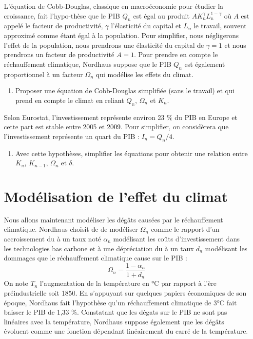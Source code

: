 \documentclass[12pt,a4paper]{article}
\newcommand{\ques}[1]{\begin{enumerate}[resume]
\item  #1
\end{enumerate}}
\newcommand{\rep}[1]{\textit{Réponse :} #1 \\}
\renewcommand{\rep}[1]{ }
\theoremstyle{remark}
\begin{document}
{L'équation de Cobb-Douglas, classique en macroéconomie pour étudier la croissance, fait l'hypo-thèse que le PIB $Q_n$ est égal au produit $AK_n^\gamma L_n^{1-\gamma}$ où $A$ est appelé le facteur de productivité, $\gamma$ l'élasticité du capital et $L_n$ le travail, souvent approximé comme étant égal à la population.
Pour simplifier, nous négligerons l'effet de la population, nous prendrons une élasticité du capital de $\gamma=1$ et nous prendrons un facteur de productivité $A=1$.
Pour prendre en compte le réchauffement climatique, Nordhaus suppose que le PIB $Q_n$ est également proportionnel à un facteur $\Omega_n$ qui modélise les effets du climat. 
\ques{  Proposer une équation de Cobb-Douglas simplifiée (sans le travail) et qui prend en compte le climat en reliant $Q_{n}$, $\Omega_n$ et $K_{n}$.
}
\rep{ $Q_{n}=A \Omega_n K_n$ }
Selon Eurostat, l'investissement représente environ 23 \% du PIB en Europe et cette part est stable entre 2005 et 2009. Pour simplifier, on considèrera que l'investissement représente un quart du PIB : $I_n=Q_n/4$.
\ques{Avec cette hypothèses, simplifier les équations pour obtenir une relation entre $K_n$, $K_{n-1}$, $\Omega_n$ et $\delta$. \label{ques:dynamique_K_1}}
\rep{\begin{equation*} K_n=\frac{1- \delta}{1- \frac{A\Omega_n}{4}} K_{n-1}\end{equation*}}


\section*{\sc Modélisation de l'effet du climat}

Nous allons maintenant modéliser les dégâts causées par le réchauffement climatique. Nordhaus choisit de de modéliser $\Omega_n$ comme le rapport d'un accroissement du à un taux noté $\alpha_n$ modélisant les coûts d'investissement dans les technologies bas carbone et à une dépréciation du à un taux $d_n$ modélisant les dommages que le réchauffement climatique cause sur le PIB :
\begin{equation*}
\Omega_n=\frac{1-\alpha_n}{1+d_n}
\end{equation*}
On note $T_n$ l'augmentation de la température en °C par rapport à l'ère préindustrielle soit 1850.
En s'appuyant sur quelques papiers économiques de son époque, Nordhaus fait l'hypothèse qu'un réchauffement climatique de 3°C fait baisser le PIB de 1,33 \%. 
Constatant que les dégats sur le PIB ne sont pas linéaires avec la température, Nordhaus suppose également que les dégâts évoluent comme une fonction dépendant linéairement du carré de la température.


}
\end{document}
